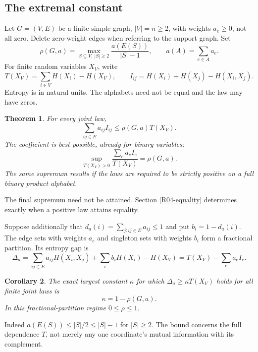 \documentclass[11pt,a4paper]{article}
\newtheorem{theorem}{Theorem}[section]
\newtheorem{corollary}[theorem]{Corollary}
\theoremstyle{definition}\newtheorem{definition}[theorem]{Definition}
\theoremstyle{remark}\newtheorem{remark}[theorem]{Remark}
\numberwithin{equation}{section}
\begin{document}
\subsection{The extremal constant}\label{R04-sec-1}
Let $G=(V,E)$ be a finite simple graph, $|V|=n\geq2$, with weights $a_e\geq0$, not all zero. Delete zero-weight edges when referring to the support graph. Set
\[
\rho(G,a)=\max_{S\subseteq V,\ |S|\geq2}\frac{a(E(S))}{|S|-1},
\qquad a(A)=\sum_{e\in A}a_e.
\]
For finite random variables $X_V$, write
\[
T(X_V)=\sum_{i\in V}H(X_i)-H(X_V),\qquad I_{ij}=H(X_i)+H(X_j)-H(X_i,X_j).
\]
Entropy is in natural units. The alphabets need not be equal and the law may have zeros.
\begin{theorem}\label{R04-sharp}
For every joint law,
\begin{equation}\label{R04-mi}
\sum_{ij\in E}a_{ij}I_{ij}\leq\rho(G,a)T(X_V).
\end{equation}
The coefficient is best possible, already for binary variables:
\[
\sup_{T(X_V)>0}\frac{\sum_ea_eI_e}{T(X_V)}=\rho(G,a).
\]
The same supremum results if the laws are required to be strictly positive on a full binary product alphabet.
\end{theorem}
The final supremum need not be attained. Section \ref{R04-equality} determines exactly when a positive law attains equality.

Suppose additionally that $d_a(i)=\sum_{j:ij\in E}a_{ij}\leq1$ and put $b_i=1-d_a(i)$. The edge sets with weights $a_e$ and singleton sets with weights $b_i$ form a fractional partition. Its entropy gap is
\[
\Delta_a=\sum_{ij\in E}a_{ij}H(X_i,X_j)+\sum_i b_iH(X_i)-H(X_V)
=T(X_V)-\sum_ea_eI_e.
\]
\begin{corollary}\label{R04-stab}
The exact largest constant $\kappa$ for which $\Delta_a\geq\kappa T(X_V)$ holds for all finite joint laws is
\[
\kappa=1-\rho(G,a).
\]
In this fractional-partition regime $0\leq\rho\leq1$.
\end{corollary}
Indeed $a(E(S))\leq|S|/2\leq|S|-1$ for $|S|\geq2$. The bound concerns the full dependence $T$, not merely any one coordinate's mutual information with its complement.
\end{document}
